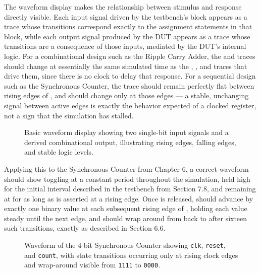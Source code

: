 The waveform display makes the relationship between stimulus and response directly visible. Each input signal driven by the testbench's  block appears as a trace whose transitions correspond exactly to the assignment statements in that block, while each output signal produced by the DUT appears as a trace whose transitions are a consequence of those inputs, mediated by the DUT's internal logic. For a combinational design such as the Ripple Carry Adder, the  and  traces should change at essentially the same simulated time as the , , and  traces that drive them, since there is no clock to delay that response. For a sequential design such as the Synchronous Counter, the  trace should remain perfectly flat between rising edges of , and should change only at those edges --- a stable, unchanging signal between active edges is exactly the behavior expected of a clocked register, not a sign that the simulation has stalled.


\begin{figure}[h]
\centering
\caption{Basic waveform display showing two single-bit input signals and a derived combinational output, illustrating rising edges, falling edges, and stable logic levels.}
\label{fig:basic_waveform}
\end{figure}

Applying this to the Synchronous Counter from Chapter 6, a correct waveform should show  toggling at a constant period throughout the simulation,  held high for the initial interval described in the testbench from Section 7.8, and  remaining at  for as long as  is asserted at a rising edge. Once  is released,  should advance by exactly one binary value at each subsequent rising edge of , holding each value steady until the next edge, and should wrap around from  back to  after sixteen such transitions, exactly as described in Section 6.6.


\begin{figure}[h]
\centering
\caption{Waveform of the 4-bit Synchronous Counter showing \texttt{clk}, \texttt{reset}, and \texttt{count}, with state transitions occurring only at rising clock edges and wrap-around visible from \texttt{1111} to \texttt{0000}.}
\label{fig:counter_waveform_example}
\end{figure}

